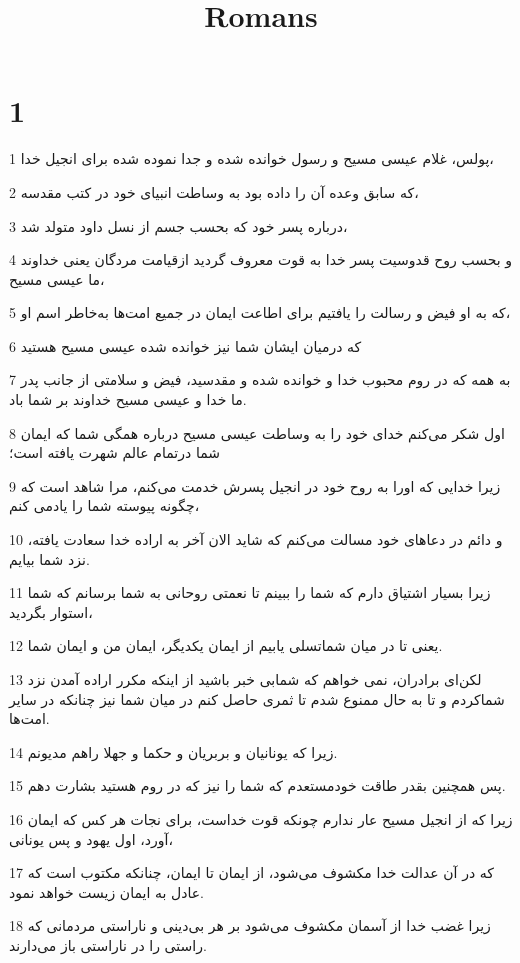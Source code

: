 

\title{Romans}


\chapter{1}

\par 1 پولس، غلام عیسی مسیح و رسول خوانده شده و جدا نموده شده برای انجیل خدا،
\par 2 که سابق وعده آن را داده بود به وساطت انبیای خود در کتب مقدسه،
\par 3 درباره پسر خود که بحسب جسم از نسل داود متولد شد،
\par 4 و بحسب روح قدوسیت پسر خدا به قوت معروف گردید ازقیامت مردگان یعنی خداوند ما عیسی مسیح،
\par 5 که به او فیض و رسالت را یافتیم برای اطاعت ایمان در جمیع امت‌ها به‌خاطر اسم او،
\par 6 که درمیان ایشان شما نیز خوانده شده عیسی مسیح هستید
\par 7 به همه که در روم محبوب خدا و خوانده شده و مقدسید، فیض و سلامتی از جانب پدر ما خدا و عیسی مسیح خداوند بر شما باد.
\par 8 اول شکر می‌کنم خدای خود را به وساطت عیسی مسیح درباره همگی شما که ایمان شما درتمام عالم شهرت یافته است؛
\par 9 زیرا خدایی که اورا به روح خود در انجیل پسرش خدمت می‌کنم، مرا شاهد است که چگونه پیوسته شما را یادمی کنم،
\par 10 و دائم در دعاهای خود مسالت می‌کنم که شاید الان آخر به اراده خدا سعادت یافته، نزد شما بیایم.
\par 11 زیرا بسیار اشتیاق دارم که شما را ببینم تا نعمتی روحانی به شما برسانم که شما استوار بگردید،
\par 12 یعنی تا در میان شماتسلی یابیم از ایمان یکدیگر، ایمان من و ایمان شما.
\par 13 لکن‌ای برادران، نمی خواهم که شمابی خبر باشید از اینکه مکرر اراده آمدن نزد شماکردم و تا به حال ممنوع شدم تا ثمری حاصل کنم در میان شما نیز چنانکه در سایر امت‌ها.
\par 14 زیرا که یونانیان و بربریان و حکما و جهلا راهم مدیونم.
\par 15 پس همچنین بقدر طاقت خودمستعدم که شما را نیز که در روم هستید بشارت دهم.
\par 16 زیرا که از انجیل مسیح عار ندارم چونکه قوت خداست، برای نجات هر کس که ایمان آورد، اول یهود و پس یونانی،
\par 17 که در آن عدالت خدا مکشوف می‌شود، از ایمان تا ایمان، چنانکه مکتوب است که عادل به ایمان زیست خواهد نمود.
\par 18 زیرا غضب خدا از آسمان مکشوف می‌شود بر هر بی‌دینی و ناراستی مردمانی که راستی را در ناراستی باز می‌دارند.
